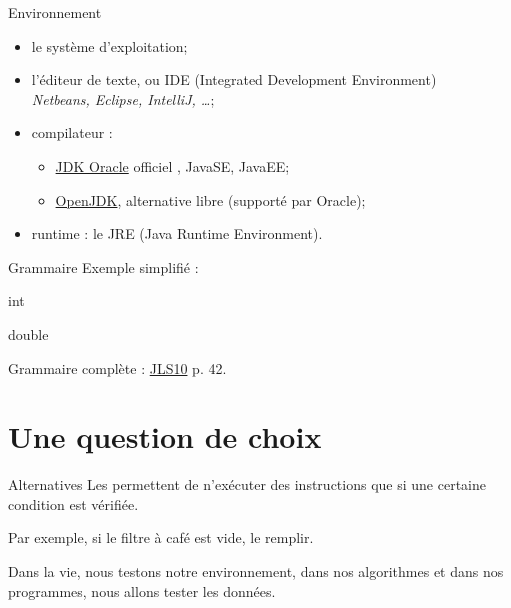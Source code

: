 \begin{hideedit}
\begin{frame}{Environnement}
  \begin{itemize}
    \item le système d'exploitation;
    \item l'éditeur de texte, ou IDE (Integrated Development Environment)\\
      \textit{Netbeans, Eclipse, IntelliJ, \dots};
    \item compilateur :
      \begin{itemize}
        \item
          \href{http://www.oracle.com/technetwork/java/javase/downloads}
          {JDK Oracle} \og officiel \fg, JavaSE, JavaEE;
        \item \href{http://openjdk.java.net/}{OpenJDK}, alternative libre
          (supporté par Oracle);
      \end{itemize}
    \item runtime : le JRE (Java Runtime Environment).
  \end{itemize}
\end{frame}

\begin{frame}[fragile]{Grammaire}
  Exemple simplifié :
\begin{grammaire}

    int

    double
\end{grammaire}

  Grammaire complète : \href{https://docs.oracle.com/javase/specs/jls/se10/jls10.pdf}{JLS10} p. 42.
\end{frame}

\section{Une question de choix}
\frame{\sectionpage}

\begin{frame}{Alternatives}
  Les  permettent de n’exécuter des
  instructions que si une certaine \alert{condition} est vérifiée.

  Par exemple, si le filtre à café est vide, le remplir.

  Dans la vie, nous testons notre environnement, dans nos algorithmes et
  dans nos programmes, nous allons tester les données.

\end{frame}


\end{hideedit}
